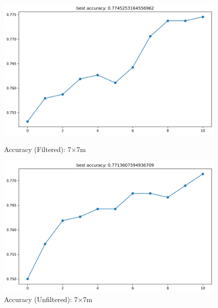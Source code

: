\documentclass[runningheads]{llncs}
\begin{document}
\begin{figure}[H]
	\centering
	\begin{minipage}{0.49\textwidth}
		\centering
		\includegraphics[width=\textwidth]{figures/filtered/svm_acc_7.png}
		\caption*{Accuracy (Filtered): 7×7m}
	\end{minipage}
	\hfill
	\begin{minipage}{0.49\textwidth}
		\centering
		\includegraphics[width=\textwidth]{figures/unfiltered/svm_acc_7.png}
		\caption*{Accuracy (Unfiltered): 7×7m}
	\end{minipage}
\end{figure}
\end{document}
